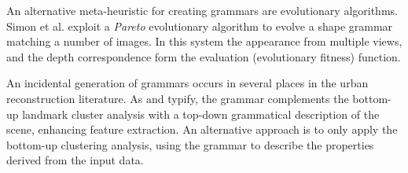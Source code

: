 An alternative meta-heuristic for creating grammars are evolutionary algorithms. Simon et al.\cite{Simon12} exploit a \emph{Pareto} evolutionary algorithm to evolve a \facade{} shape grammar matching a number of images. In this system the appearance from multiple views, and the depth correspondence form the evaluation (evolutionary fitness) function. 

An incidental generation of grammars occurs in several places in the urban reconstruction literature. As \cite{Han:2005:BTI} and \cite{Becker09} typify, the grammar complements the bottom-up landmark cluster analysis with a top-down grammatical description of the scene, enhancing feature extraction. An alternative approach\cite{Toshev10} is to only apply the bottom-up clustering analysis, using the grammar to describe the properties derived from the input data.





